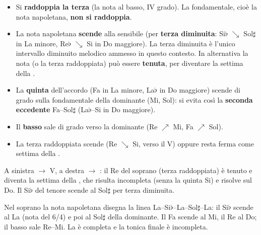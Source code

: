 \begin{regola}
	\label{reg:condotta_napoletana}
	\begin{itemize}
		\item Si \textbf{raddoppia la terza} (la nota al basso, IV grado). La fondamentale, cioè la nota napoletana, \textbf{non si raddoppia}.
		\item La nota napoletana \textbf{scende} alla sensibile (per \textbf{terza diminuita}: Si$\flat$ $\searrow$ Sol$\sharp$ in La minore, Re$\flat$ $\searrow$ Si in Do maggiore). La terza diminuita è l'unico intervallo diminuito melodico ammesso in questo contesto. In alternativa la nota (o la terza raddoppiata) può essere \textbf{tenuta}, per diventare la settima della .
		\item La \textbf{quinta} dell'accordo (Fa in La minore, La$\flat$ in Do maggiore) scende di grado sulla fondamentale della dominante (Mi, Sol): si evita così la \textbf{seconda eccedente} Fa--Sol$\sharp$ (La$\flat$--Si in Do maggiore).
		\item Il \textbf{basso} sale di grado verso la dominante (Re $\nearrow$ Mi, Fa $\nearrow$ Sol).
		\item La terza raddoppiata scende (Re $\searrow$ Si, verso il V) oppure resta ferma come settima della .
	\end{itemize}
\end{regola}

\begin{esempio}
	\label{ex:napoletana_minore}
	A sinistra  $\rightarrow$ V, a destra  $\rightarrow$ : il Re del soprano (terza raddoppiata) è tenuto e diventa la settima della , che risulta incompleta (senza la quinta Si) e risolve sul Do. Il Si$\flat$ del tenore scende al Sol$\sharp$ per terza diminuita.
\end{esempio}

\begin{esempio}
	\label{ex:napoletana_cadenza_minore}
	Nel soprano la nota napoletana disegna la linea La--Si$\flat$--La--Sol$\sharp$--La: il Si$\flat$ scende al La (nota del 6/4) e poi al Sol$\sharp$ della dominante. Il Fa scende al Mi, il Re al Do; il basso sale Re--Mi. La  è completa e la tonica finale è incompleta.
\end{esempio}

